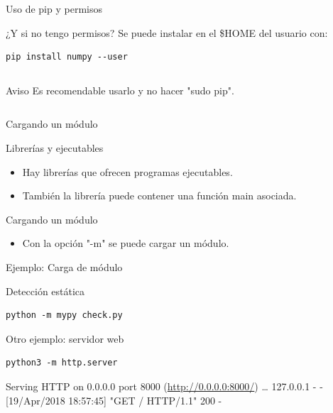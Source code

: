 \documentclass[bigger,unknownkeysallowed]{beamer}
\begin{document}
\begin{frame}[fragile,label={sec:org09091ba}]{Uso de pip y permisos}
 \begin{block}{¿Y si no tengo permisos?}
Se puede instalar en el \$HOME del usuario con:

\begin{verbatim}
pip install numpy --user
\end{verbatim}
\end{block}

\begin{columns}
\begin{column}{0.8\columnwidth}
\begin{alertblock}{Aviso}
Es recomendable usarlo y no hacer "sudo pip".
\end{alertblock}
\end{column}
\end{columns}
\end{frame}


\begin{frame}[label={sec:orgb8d05a1}]{Cargando un módulo}
\begin{block}{Librerías y ejecutables}
\begin{itemize}
\item Hay librerías que ofrecen programas ejecutables.

\item También la librería puede contener una función main asociada.
\end{itemize}
\end{block}

\begin{block}{Cargando un módulo}
\begin{itemize}
\item Con la opción "-m" se puede cargar un módulo.
\end{itemize}
\end{block}
\end{frame}

\begin{frame}[fragile,label={sec:orgd75bd87}]{Ejemplo: Carga de módulo}
 \begin{block}{Detección estática}
\begin{verbatim}
python -m mypy check.py
\end{verbatim}
\end{block}


\begin{block}{Otro ejemplo: servidor web}
\begin{verbatim}
python3 -m http.server
\end{verbatim}
\scriptsize
Serving HTTP on 0.0.0.0 port 8000 (\url{http://0.0.0.0:8000/}) \ldots{}
127.0.0.1 - - [19/Apr/2018 18:57:45] "GET / HTTP/1.1" 200 -
\end{block}
\end{frame}
\end{document}
